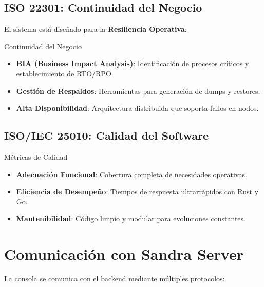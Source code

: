 \subsection{ISO 22301: Continuidad del Negocio}

El sistema está diseñado para la \textbf{Resiliencia Operativa}:

\begin{caja}{Continuidad del Negocio}
\begin{itemize}
\item \textbf{BIA (Business Impact Analysis)}: Identificación de procesos críticos y establecimiento de RTO/RPO.
\item \textbf{Gestión de Respaldos}: Herramientas para generación de dumps y restores.
\item \textbf{Alta Disponibilidad}: Arquitectura distribuida que soporta fallos en nodos.
\end{itemize}
\end{caja}


\subsection{ISO/IEC 25010: Calidad del Software}

\begin{caja}{Métricas de Calidad}
\begin{itemize}
\item \textbf{Adecuación Funcional}: Cobertura completa de necesidades operativas.
\item \textbf{Eficiencia de Desempeño}: Tiempos de respuesta ultrarrápidos con Rust y Go.
\item \textbf{Mantenibilidad}: Código limpio y modular para evoluciones constantes.
\end{itemize}
\end{caja}


\section{Comunicación con Sandra Server}

La consola se comunica con el backend mediante múltiples protocolos:


